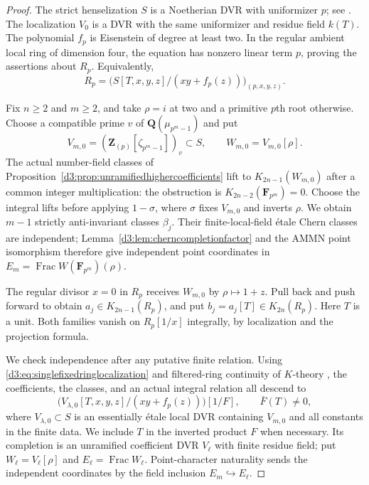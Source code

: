 \documentclass[11pt,a4paper]{amsart}
\numberwithin{equation}{section}
\theoremstyle{definition}
\theoremstyle{remark}
\newcommand{\Q}{\mathbf Q}
\newcommand{\Z}{\mathbf Z}
\newcommand{\F}{\mathbf F}
\newcommand{\Frac}{\operatorname{Frac}}
\begin{document}
\begin{proof}
The strict henselization $S$ is a Noetherian DVR with uniformizer
$p$; see \cite[Tags~06LJ and~0AP3]{StacksHenselization}.
The localization $V_0$ is a DVR with the same uniformizer and
residue field $k(T)$.
The polynomial $f_p$ is Eisenstein of degree at least two.
In the regular ambient local ring of dimension four, the equation
has nonzero linear term $p$, proving the assertions about $R_p$.
Equivalently,
\begin{equation}\label{d3:eq:singlefixedringlocalization}
 R_p=\bigl(S[T,x,y,z]/(xy+f_p(z))\bigr)_{(p,x,y,z)}.
\end{equation}

Fix $n\geq2$ and $m\geq2$, and take $\rho=i$ at two and a
primitive $p$th root otherwise.
Choose a compatible prime $v$ of $\Q(\mu_{p^m-1})$ and put
\[
 V_{m,0}=(\Z_{(p)}[\zeta_{p^m-1}])_v\subset S,
 \qquad W_{m,0}=V_{m,0}[\rho].
\]
The actual number-field classes of
Proposition~\ref{d3:prop:unramifiedhighercoefficients} lift to
$K_{2n-1}(W_{m,0})$ after a common integer multiplication:
the obstruction is $K_{2n-2}(\F_{p^m})=0$.
Choose the integral lifts before applying $1-\sigma$, where
$\sigma$ fixes $V_{m,0}$ and inverts $\rho$.
We obtain $m-1$ strictly anti-invariant classes $\beta_j$.
Their finite-local-field \'etale Chern classes are independent;
Lemma~\ref{d3:lem:cherncompletionfactor} and the AMMN point isomorphism
therefore give independent point coordinates in
$E_m=\Frac W(\F_{p^m})(\rho)$.

The regular divisor $x=0$ in $R_p$ receives $W_{m,0}$ by
$\rho\mapsto1+z$.
Pull back and push forward to obtain $a_j\in K_{2n-1}(R_p)$,
and put $b_j=a_j[T]\in K_{2n}(R_p)$.
Here $T$ is a unit. Both families vanish on $R_p[1/x]$
integrally, by localization and the projection formula.

We check independence after any putative finite relation.
Using \eqref{d3:eq:singlefixedringlocalization} and
filtered-ring continuity of $K$-theory
\cite[IV, Section~6.4]{Weibel}, the coefficients, the classes,
and an actual integral relation all descend to
\[
 \bigl(V_{\lambda,0}[T,x,y,z]/(xy+f_p(z))\bigr)[1/F],
 \qquad \bar F(T)\ne0,
\]
where $V_{\lambda,0}\subset S$ is an essentially \'etale local
DVR containing $V_{m,0}$ and all constants in the finite data.
We include $T$ in the inverted product $F$ when necessary.
Its completion is an unramified coefficient DVR $V_\ell$ with
finite residue field; put $W_\ell=V_\ell[\rho]$ and
$E_\ell=\Frac W_\ell$.
Point-character naturality sends the independent coordinates by
the field inclusion $E_m\hookrightarrow E_\ell$.


\end{proof}
\end{document}
